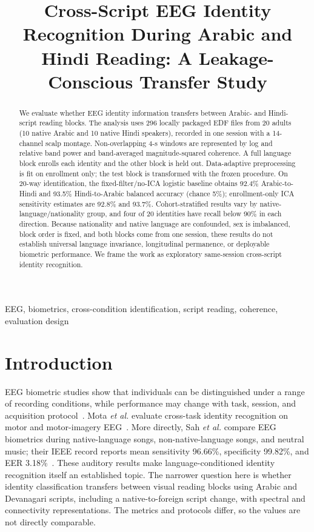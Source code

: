 \documentclass[conference]{IEEEtran}
\begin{document}
\title{Cross-Script EEG Identity Recognition During Arabic and Hindi Reading: A Leakage-Conscious Transfer Study}
\author{}
\maketitle

\begin{abstract}
We evaluate whether EEG identity information transfers between Arabic- and Hindi-script reading blocks. The analysis uses 296 locally packaged EDF files from 20 adults (10 native Arabic and 10 native Hindi speakers), recorded in one session with a 14-channel scalp montage. Non-overlapping 4-s windows are represented by log and relative band power and band-averaged magnitude-squared coherence. A full language block enrolls each identity and the other block is held out. Data-adaptive preprocessing is fit on enrollment only; the test block is transformed with the frozen procedure. On 20-way identification, the fixed-filter/no-ICA logistic baseline obtains 92.4\% Arabic-to-Hindi and 93.5\% Hindi-to-Arabic balanced accuracy (chance 5\%); enrollment-only ICA sensitivity estimates are 92.8\% and 93.7\%. Cohort-stratified results vary by native-language/nationality group, and four of 20 identities have recall below 90\% in each direction. Because nationality and native language are confounded, sex is imbalanced, block order is fixed, and both blocks come from one session, these results do not establish universal language invariance, longitudinal permanence, or deployable biometric performance. We frame the work as exploratory same-session cross-script identity recognition.
\end{abstract}
\begin{IEEEkeywords}
EEG, biometrics, cross-condition identification, script reading, coherence, evaluation design
\end{IEEEkeywords}

\section{Introduction}
EEG biometric studies show that individuals can be distinguished under a range of recording conditions, while performance may change with task, session, and acquisition protocol~\cite{campisi2014,gui2019,delpozo2018,mota2021}. Mota \emph{et al.} evaluate cross-task identity recognition on motor and motor-imagery EEG~\cite{mota2021}. More directly, Sah \emph{et al.} compare EEG biometrics during native-language songs, non-native-language songs, and neutral music; their IEEE record reports mean sensitivity 96.66\%, specificity 99.82\%, and EER 3.18\%~\cite{sah2025}. These auditory results make language-conditioned identity recognition itself an established topic. The narrower question here is whether identity classification transfers between visual reading blocks using Arabic and Devanagari scripts, including a native-to-foreign script change, with spectral and connectivity representations. The metrics and protocols differ, so the values are not directly comparable.
\end{document}
